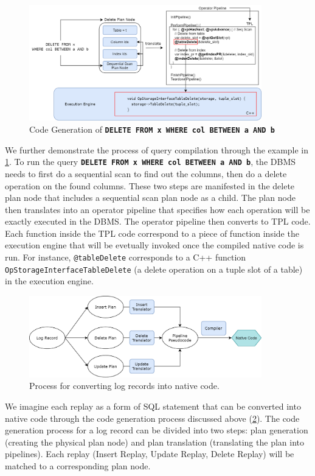 \documentclass[12pt]{cmuthesis}
\newcommand{\dbSQL}[1]{\texttt{\textbf{#1}}\xspace}
\begin{document}
\begin{figure}[t!]
\centering
\includegraphics[width=0.9\textwidth]{images/CodegenExample.png}
\caption{Code Generation of \dbSQL{DELETE FROM x WHERE col BETWEEN a AND b}}
\label{fig:codegen_example}
\end{figure}

We further demonstrate the process of query compilation through the example in \cref{fig:codegen_example}. To run the query \dbSQL{DELETE FROM x WHERE col BETWEEN a AND b}, the DBMS needs to first do a sequential scan to find out the columns, then do a delete operation on the found columns. These two steps are manifested in the delete plan node that includes a sequential scan plan node as a child. The plan node then translates into an operator pipeline that specifies how each operation will be exactly executed in the DBMS. The operator pipeline then converts to TPL code. Each function inside the TPL code correspond to a piece of function inside the execution engine that will be evetually invoked once the compiled native code is run. For instance, \texttt{@tableDelete} corresponds to a C++ function \texttt{OpStorageInterfaceTableDelete} (a delete operation on a tuple slot of a table) in the execution engine.

\begin{figure}[t!]
\centering
\includegraphics[width=0.9\textwidth]{images/ExpressionGeneration.png}
\caption{Process for converting log records into native code.}
\label{fig:expression_generation}
\end{figure}
We imagine each replay as a form of SQL statement that can be converted into native code through the code generation process discussed above (\cref{fig:expression_generation}). The code generation process for a log record can be divided into two steps: plan generation (creating the physical plan node) and plan translation (translating the plan into pipelines). Each replay (Insert Replay, Update Replay, Delete Replay) will be matched to a corresponding plan node.
\end{document}
